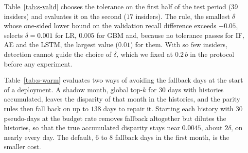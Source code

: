 \documentclass[10pt,onecolumn,letterpaper]{article}
\begin{document}
Table~\ref{tab:s-valid} chooses the tolerance on the first half of the test period ($39$ insiders) and evaluates it on the second ($17$ insiders). The rule, the smallest $\delta$ whose one-sided lower bound on the validation recall difference exceeds $-0.05$, selects $\delta=0.001$ for LR, $0.005$ for GBM and, because no tolerance passes for IF, AE and the LSTM, the largest value ($0.01$) for them. With so few insiders, detection cannot guide the choice of $\delta$, which we fixed at $0.2\,b$ in the protocol before any experiment.

Table~\ref{tab:s-warm} evaluates two ways of avoiding the fallback days at the start of a deployment. A shadow month, global top-$k$ for $30$ days with histories accumulated, leaves the disparity of that month in the histories, and the parity rules then fall back on up to $138$ days to repair it. Starting each history with $30$ pseudo-days at the budget rate removes fallback altogether but dilutes the histories, so that the true accumulated disparity stays near $0.0045$, about $2\delta$, on nearly every day. The default, $6$ to $8$ fallback days in the first month, is the smaller cost.
\end{document}
